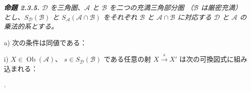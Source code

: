 \begingroup\itshape
{}
\medskip\noindent\textbf{命題 2.3.5.}\quad
{}
$\mathcal D$ を三角圏、$\mathcal A$ と $\mathcal B$ を二つの充満三角部分圏
（$\mathcal B$ は厳密充満）とし、$S_{\mathcal D}(\mathcal B)$ と
$S_{\mathcal A}(\mathcal A\cap\mathcal B)$ をそれぞれ $\mathcal B$ と
$\mathcal A\cap\mathcal B$ に対応する $\mathcal D$ と $\mathcal A$ の
乗法的系とする。
\par\noindent a) 次の条件は同値である：
\par\noindent\hspace{1.2em}i) $X\in\operatorname{Ob}(\mathcal A)$、
$s\in S_{\mathcal D}(\mathcal B)$ である任意の射
$X\xrightarrow{s}X'$ は次の可換図式に組み込まれる：
\begin{center}
 \quad .
\end{center}
\endgroup
\endgroup
